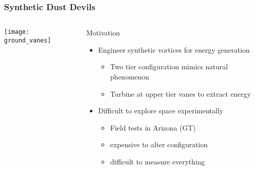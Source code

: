 \documentclass[mathserif]{beamer}
\begin{document}
%
%
%
\begin{frame}
\frametitle{Synthetic Dust Devils}

\begin{columns}[]
  \begin{column}{0.45\linewidth}
   \begin{center}
    \texttt{[image: ground\_vanes]}
   \end{center}
  \end{column}
  \begin{column}{0.55\linewidth}
   \begin{block}{Motivation}
    \begin{itemize}
     \item Engineer synthetic vortices for energy generation
       \begin{itemize}
	\item Two tier configuration mimics natural phenomenon
	\item Turbine at upper tier vanes to extract energy
       \end{itemize}

     \item Difficult to explore space experimentally
	   \begin{itemize}
	    \item Field tests in Arizona (GT)
	    \item expensive to alter configuration
	    \item difficult to measure everything
	   \end{itemize}
    \end{itemize}
   \end{block}

  \end{column}
\end{columns}
   
\end{frame}
\end{document}
